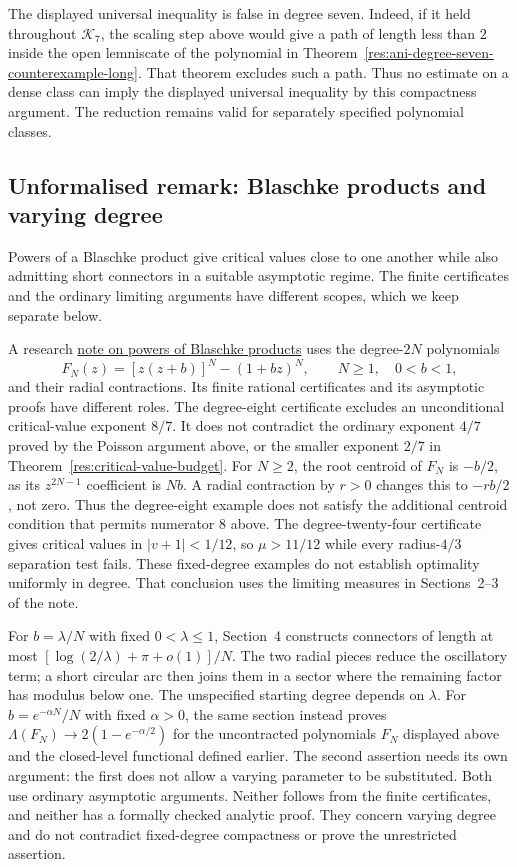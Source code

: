 The displayed universal inequality is false in degree seven. Indeed,
if it held throughout $\mathcal K_7$, the scaling step above would give
a path of length less than $2$ inside the open lemniscate of the
polynomial in Theorem~\ref{res:ani-degree-seven-counterexample-long}.
That theorem excludes such a path. Thus no estimate on a dense class can
imply the displayed universal inequality by this compactness argument.
The reduction remains valid for separately specified polynomial classes.

\subsection*{Unformalised remark: Blaschke products and varying degree}
\hypertarget{blaschke-product-examples}{}
Powers of a Blaschke product give critical values close to one another
while also admitting short connectors in a suitable asymptotic regime.
The finite certificates and the ordinary limiting arguments have
different scopes, which we keep separate below.

A research
\href{https://github.com/wcook04/plectis-erdos/blob/f36a98bf3d3e6f65f1074e3b800e3293d5b8a51a/ErdosProblems/Erdos1041/BlaschkePowerCriticalSpectra.md}{note on powers of Blaschke products}
uses the degree-$2N$ polynomials
\[
 F_N(z)=[z(z+b)]^N-(1+bz)^N,\qquad N\ge1,\quad 0<b<1,
\]
and their radial contractions. Its finite rational certificates and
its asymptotic proofs have different roles. The degree-eight certificate
excludes an unconditional critical-value exponent $8/7$. It does not
contradict the ordinary exponent $4/7$ proved by the Poisson argument above,
or the smaller exponent $2/7$ in Theorem~\ref{res:critical-value-budget}.
For $N\ge2$, the root centroid of $F_N$ is $-b/2$, as its
$z^{2N-1}$ coefficient is $Nb$. A radial contraction by $r>0$ changes
this to $-rb/2$, not zero. Thus the degree-eight example does not satisfy
the additional centroid condition that permits numerator $8$ above. The degree-twenty-four certificate gives critical values in
$|v+1|<1/12$, so $\mu>11/12$ while every radius-$4/3$ separation test
fails. These fixed-degree examples do not establish optimality uniformly
in degree. That conclusion uses the limiting measures in Sections~2--3
of the note.

For $b=\lambda/N$ with fixed $0<\lambda\le1$, Section~4 constructs
connectors of length at most
$[\log(2/\lambda)+\pi+o(1)]/N$. The two radial pieces reduce the
oscillatory term; a short circular arc then joins them in a sector where
the remaining factor has modulus below one. The unspecified starting
degree depends on $\lambda$. For $b=e^{-\alpha N}/N$ with fixed
$\alpha>0$, the same section instead proves
$\Lambda(F_N)\to2(1-e^{-\alpha/2})$ for the uncontracted polynomials
$F_N$ displayed above and the closed-level functional defined earlier.
The second assertion needs its own argument: the first does not allow
a varying parameter to be substituted. Both use ordinary asymptotic arguments. Neither follows from the
finite certificates, and neither has a formally checked analytic proof. They concern varying degree and do not contradict fixed-degree
compactness or prove the unrestricted assertion.

